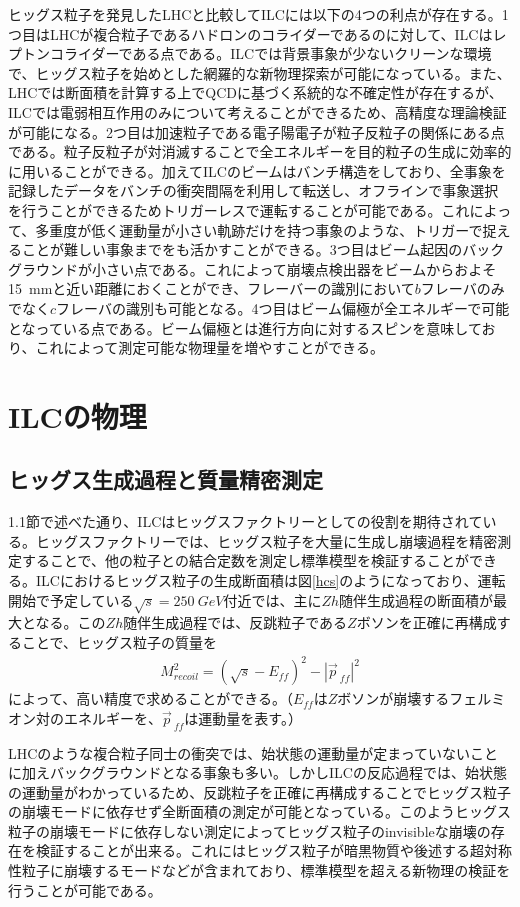 ヒッグス粒子を発見したLHCと比較してILCには以下の4つの利点が存在する。1つ目はLHCが複合粒子であるハドロンのコライダーであるのに対して、ILCはレプトンコライダーである点である。ILCでは背景事象が少ないクリーンな環境で、ヒッグス粒子を始めとした網羅的な新物理探索が可能になっている。また、LHCでは断面積を計算する上でQCDに基づく系統的な不確定性が存在するが、ILCでは電弱相互作用のみについて考えることができるため、高精度な理論検証が可能になる。2つ目は加速粒子である電子陽電子が粒子反粒子の関係にある点である。粒子反粒子が対消滅することで全エネルギーを目的粒子の生成に効率的に用いることができる。加えてILCのビームはバンチ構造をしており、全事象を記録したデータをバンチの衝突間隔を利用して転送し、オフラインで事象選択を行うことができるためトリガーレスで運転することが可能である。これによって、多重度が低く運動量が小さい軌跡だけを持つ事象のような、トリガーで捉えることが難しい事象までをも活かすことができる。3つ目はビーム起因のバックグラウンドが小さい点である。これによって崩壊点検出器をビームからおよそ\SI{15}{mm}と近い距離におくことができ、フレーバーの識別において$b$フレーバのみでなく$c$フレーバの識別も可能となる。4つ目はビーム偏極が全エネルギーで可能となっている点である。ビーム偏極とは進行方向に対するスピンを意味しており、これによって測定可能な物理量を増やすことができる。
\section{ILCの物理}
\subsection{ヒッグス生成過程と質量精密測定}
1.1節で述べた通り、ILCはヒッグスファクトリーとしての役割を期待されている。ヒッグスファクトリーでは、ヒッグス粒子を大量に生成し崩壊過程を精密測定することで、他の粒子との結合定数を測定し標準模型を検証することができる。ILCにおけるヒッグス粒子の生成断面積は図\ref{hcs}のようになっており、運転開始で予定している$\sqrt{s}=\SI{250}{GeV}$付近では、主に$Zh$随伴生成過程の断面積が最大となる。この$Zh$随伴生成過程では、反跳粒子である$Z$ボソンを正確に再構成することで、ヒッグス粒子の質量を
\begin{align}
\label{recoil}
M_{recoil}^2 = {( \sqrt{s} - E_{ff} )}^2 - {|\vec{p}_{\ ff}|}^2
\end{align}
によって、高い精度で求めることができる。（$E_{ff}$は$Z$ボソンが崩壊するフェルミオン対のエネルギーを、$\vec{p}_{\ ff}$は運動量を表す。）

LHCのような複合粒子同士の衝突では、始状態の運動量が定まっていないことに加えバックグラウンドとなる事象も多い。しかしILCの反応過程では、始状態の運動量がわかっているため、反跳粒子を正確に再構成することでヒッグス粒子の崩壊モードに依存せず全断面積の測定が可能となっている。このようヒッグス粒子の崩壊モードに依存しない測定によってヒッグス粒子のinvisibleな崩壊の存在を検証することが出来る。これにはヒッグス粒子が暗黒物質や後述する超対称性粒子に崩壊するモードなどが含まれており、標準模型を超える新物理の検証を行うことが可能である。

